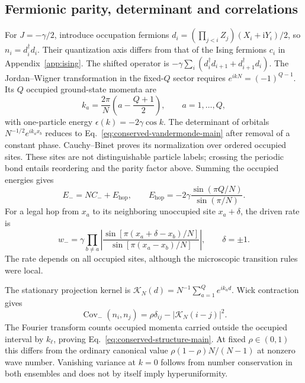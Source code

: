 \documentclass[aps,pre,reprint,amsmath,amssymb,longbibliography,floatfix]{revtex4-2}
\begin{document}
\subsection{Fermionic parity, determinant and correlations}
For $J=-\gamma/2$, introduce occupation fermions
$d_i=(\prod_{j<i}Z_j)(X_i+\mathrm iY_i)/2$, so $n_i=d_i^\dagger d_i$.
Their quantization axis differs from that of the Ising fermions $c_i$
in Appendix~\ref{app:ising}. The shifted operator is
$-\gamma\sum_i(d_i^\dagger d_{i+1}+d_{i+1}^\dagger d_i)$.
The Jordan--Wigner transformation in the fixed-$Q$ sector requires
$e^{ikN}=(-1)^{Q-1}$. Its $Q$ occupied ground-state momenta are
\begin{equation}
 k_a=\frac{2\pi}{N}\left(a-\frac{Q+1}{2}\right),
 \qquad a=1,\ldots,Q,
 \label{eq:conserved-momenta}
\end{equation}
with one-particle energy $\epsilon(k)=-2\gamma\cos k$. The determinant
of orbitals $N^{-1/2}e^{ik_a x_b}$ reduces to
Eq.~\eqref{eq:conserved-vandermonde-main} after removal of a constant
phase. Cauchy--Binet proves its normalization over ordered occupied
sites. These sites are not distinguishable particle labels; crossing
the periodic bond entails reordering and the parity factor above.
Summing the occupied energies gives
\begin{equation}
 E_-=NC_-+E_{\mathrm{hop}},\qquad
 E_{\mathrm{hop}}=-2\gamma\frac{\sin(\pi Q/N)}{\sin(\pi/N)}.
 \label{eq:conserved-free-energy}
\end{equation}
For a legal hop from $x_a$ to its neighboring unoccupied site
$x_a+\delta$, the driven rate is
\begin{equation}
 w_- =\gamma\prod_{b\ne a}
 \left|\frac{\sin\left[\pi(x_a+\delta-x_b)/N\right]}
 {\sin\left[\pi(x_a-x_b)/N\right]}\right|,\qquad\delta=\pm1.
 \label{eq:conserved-doob-product}
\end{equation}
The rate depends on all occupied sites, although the microscopic
transition rules were local.

The stationary projection kernel is
$\mathcal K_N(d)=N^{-1}\sum_{a=1}^Q e^{ik_a d}$. Wick contraction gives
\begin{equation}
 \operatorname{Cov}_-(n_i,n_j)
 =\rho\delta_{ij}-|\mathcal K_N(i-j)|^2.
 \label{eq:conserved-covariance}
\end{equation}
The Fourier transform counts occupied momenta carried outside the
occupied interval by $k_\ell$, proving
Eq.~\eqref{eq:conserved-structure-main}. At fixed
$\rho\in(0,1)$ this differs from the ordinary canonical value
$\rho(1-\rho)N/(N-1)$ at nonzero wave number. Vanishing variance at
$k=0$ follows from number conservation in both ensembles and does not
by itself imply hyperuniformity.
\end{document}
